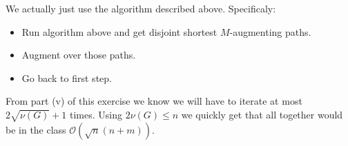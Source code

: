 \begin{exercise}{2}
\begin{enumerate}[i)]
{            We actually just use the algorithm described above.
            Specificaly:
            \begin{itemize}
                \item{Run algorithm above and get disjoint shortest
                    $M$-augmenting paths.}
                \item{Augment over those paths.}
                \item{Go back to first step.}
            \end{itemize}
            From part (v) of this exercise we know we will have to iterate at
            most $2 \sqrt{\nu(G)} + 1$ times. Using $2 \nu(G) \leq n$ we quickly
            get that all together would be in the class $\mathcal{O}(\sqrt{n}(n
            + m))$.}
    \end{enumerate}
\end{exercise}


